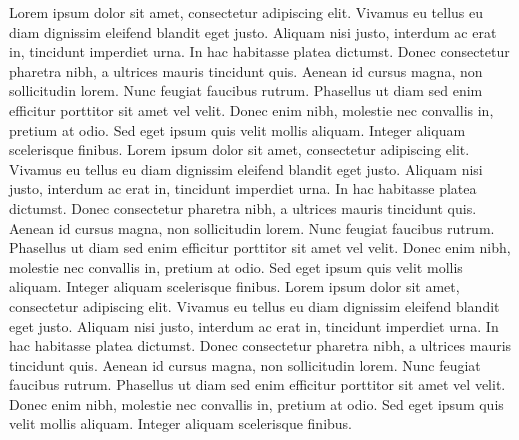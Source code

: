 \documentclass{article}
\begin{document}
\begin{pages}
\begin{Rightside}
\pend[\relax]
\endnumbering
\end{Rightside}
\begin{Leftside}
\beginnumbering
\pstart
Lorem ipsum dolor sit amet, consectetur adipiscing elit. Vivamus eu tellus eu diam dignissim eleifend blandit eget justo. Aliquam nisi justo, interdum ac erat in, tincidunt imperdiet urna. In hac habitasse platea dictumst. Donec consectetur pharetra nibh, a ultrices mauris tincidunt quis. Aenean id cursus magna, non sollicitudin lorem. Nunc feugiat faucibus rutrum. Phasellus ut diam sed enim efficitur porttitor sit amet vel velit. Donec enim nibh, molestie nec convallis in, pretium at odio. Sed eget ipsum quis velit mollis aliquam. Integer aliquam scelerisque finibus.
\pend
\pstart
Lorem ipsum dolor sit amet, consectetur adipiscing elit. Vivamus eu tellus eu diam dignissim eleifend blandit eget justo. Aliquam nisi justo, interdum ac erat in, tincidunt imperdiet urna. In hac habitasse platea dictumst. Donec consectetur pharetra nibh, a ultrices mauris tincidunt quis. Aenean id cursus magna, non sollicitudin lorem. Nunc feugiat faucibus rutrum. Phasellus ut diam sed enim efficitur porttitor sit amet vel velit. Donec enim nibh, molestie nec convallis in, pretium at odio. Sed eget ipsum quis velit mollis aliquam. Integer aliquam scelerisque finibus.
\pend
\pstart
Lorem ipsum dolor sit amet, consectetur adipiscing elit. Vivamus eu tellus eu diam dignissim eleifend blandit eget justo. Aliquam nisi justo, interdum ac erat in, tincidunt imperdiet urna. In hac habitasse platea dictumst. Donec consectetur pharetra nibh, a ultrices mauris tincidunt quis. Aenean id cursus magna, non sollicitudin lorem. Nunc feugiat faucibus rutrum. Phasellus ut diam sed enim efficitur porttitor sit amet vel velit. Donec enim nibh, molestie nec convallis in, pretium at odio. Sed eget ipsum quis velit mollis aliquam. Integer aliquam scelerisque finibus.
\pend[\relax]
\endnumbering
\end{Leftside}

\end{pages}
\Pages
\end{document}
